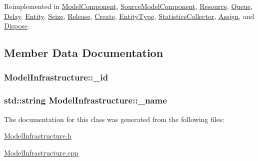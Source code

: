Reimplemented in \hyperlink{class_model_component_ad8bc846e36b028eab7efb7da6c549eca}{Model\-Component}, \hyperlink{class_source_model_component_a4011597b5780fcc0495e8e22ab8158f6}{Source\-Model\-Component}, \hyperlink{class_resource_a593cf83404dc90706943b4e60213fd01}{Resource}, \hyperlink{class_queue_ac78cc84cd91539c7f38d95dc17dabac5}{Queue}, \hyperlink{class_delay_af8187e4515417b547dc22b5ee0a1f95d}{Delay}, \hyperlink{class_entity_a86cc324050b451b31b134943e7978e36}{Entity}, \hyperlink{class_seize_a495ace3a156680b5816c8b285135322c}{Seize}, \hyperlink{class_release_a1ec7b35553820f0f228f31be1df468c3}{Release}, \hyperlink{class_create_a8d1832d2165bbeea4a5a88aded883f86}{Create}, \hyperlink{class_entity_type_ab5a696912b12a9f51decded90f368dea}{Entity\-Type}, \hyperlink{class_statistics_collector_a7ce8dad7e29d06c73a01d2ddee93fe00}{Statistics\-Collector}, \hyperlink{class_assign_a8f069af07c958138f610e13bf3303893}{Assign}, and \hyperlink{class_dispose_aee8ef98d5ca22eb18a97b258ed059865}{Dispose}.



\subsection{Member Data Documentation}
\hypertarget{class_model_infrastructure_af6fe00f683f5e29cbcd667e4d3bd24d0}{
\subsubsection[{\-\_\-id}]{ Model\-Infrastructure\-::\-\_\-id\hspace{0.3cm}{\ttfamily [protected]}}}\label{class_model_infrastructure_af6fe00f683f5e29cbcd667e4d3bd24d0}
\hypertarget{class_model_infrastructure_aa73c0444ba8e3515e2aec3154eaad85d}{
\subsubsection[{\-\_\-name}]{\setlength{\rightskip}{0pt plus 5cm}std\-::string Model\-Infrastructure\-::\-\_\-name\hspace{0.3cm}{\ttfamily [protected]}}}\label{class_model_infrastructure_aa73c0444ba8e3515e2aec3154eaad85d}


The documentation for this class was generated from the following files\-:\begin{DoxyCompactItemize}
\item 
\hyperlink{_model_infrastructure_8h}{Model\-Infrastructure.\-h}\item 
\hyperlink{_model_infrastructure_8cpp}{Model\-Infrastructure.\-cpp}\end{DoxyCompactItemize}
